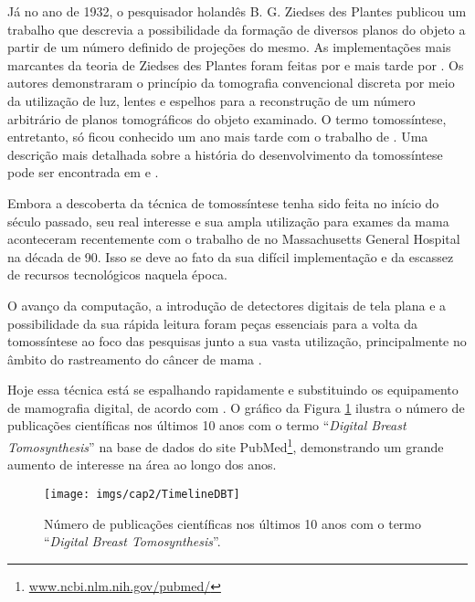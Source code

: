 Já no ano de 1932, o pesquisador holandês B. G. Ziedses des Plantes publicou um trabalho \cite{des1932neue} que descrevia a possibilidade da formação de diversos planos do objeto a partir de um número definido de projeções do mesmo. As implementações mais marcantes da teoria de Ziedses des Plantes foram feitas por  e mais tarde por . Os autores demonstraram o princípio da tomografia convencional discreta por meio da utilização de luz, lentes e espelhos para a reconstrução de um número arbitrário de planos tomográficos do objeto examinado. O termo tomossíntese, entretanto, só ficou conhecido um ano mais tarde com o trabalho de . Uma descrição mais detalhada sobre a história do desenvolvimento da tomossíntese pode ser encontrada em   e . 

Embora a descoberta da técnica de tomossíntese tenha sido feita no início do século passado, seu real interesse e sua ampla utilização para exames da mama aconteceram recentemente com o trabalho de   no Massachusetts General Hospital na década de 90. Isso se deve ao fato da sua difícil implementação e da escassez de recursos tecnológicos naquela época. 

O avanço da computação, a introdução de detectores digitais de tela plana e a possibilidade da sua rápida leitura foram peças essenciais para a volta da tomossíntese ao foco das pesquisas junto a sua vasta utilização, principalmente no âmbito do rastreamento do câncer de mama \cite{Niklason20185}. 

Hoje essa técnica está se espalhando rapidamente e substituindo os equipamento de mamografia digital, de acordo com . O gráfico da Figura \ref{fig:imgCap2TimelineDBT} ilustra o número de publicações científicas nos últimos 10 anos com o termo ``\textit{Digital Breast Tomosynthesis}'' na base de dados do site PubMed\footnote{\url{www.ncbi.nlm.nih.gov/pubmed/}}, demonstrando um grande aumento de interesse na área ao longo dos anos.
 
\begin{figure}[H]
	\caption{Número de publicações científicas nos últimos 10 anos com o termo ``\textit{Digital Breast Tomosynthesis}''.}
	\begin{center}
		\texttt{[image: imgs/cap2/TimelineDBT]}
	\end{center}
	\label{fig:imgCap2TimelineDBT}
\end{figure}

